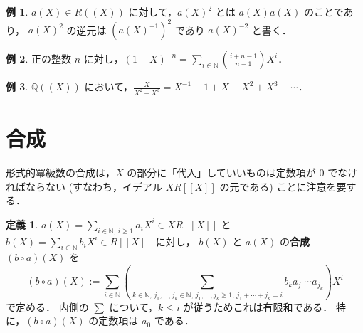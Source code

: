 \documentclass{jsarticle}
\newcommand{\N}{\mathbb{N}}
\newcommand{\Q}{\mathbb{Q}}
\theoremstyle{definition}
\newtheorem*{Dfn}{定義}
\newtheorem*{Exm}{例}
\newenvironment{dfn}{\vspace{1ex}\begin{screen}\begin{Dfn}}{\end{Dfn}\end{screen}\vspace{1ex}}
\newenvironment{exm}{\begin{leftbar}\begin{Exm}}{\end{Exm}\end{leftbar}}
\begin{document}
\begin{exm}
  $a(X) \in R((X))$ に対して，$a(X)^2$ とは $a(X) a(X)$ のことであり，
  $a(X)^2$ の逆元は $(a(X)^{-1})^2$ であり $a(X)^{-2}$ と書く．
\end{exm}

\begin{exm}
  正の整数 $n$ に対し，$(1 - X)^{-n} = \sum_{i\in\N} \binom{i+n-1}{n-1} X^i$．
\end{exm}

\begin{exm}
  $\Q((X))$ において，$\frac{X}{X^2 + X^3} = X^{-1} - 1 + X - X^2 + X^3 - \cdots$．
\end{exm}


\section{合成}
形式的冪級数の合成は，$X$ の部分に「代入」していいものは定数項が $0$ でなければならない (すなわち，イデアル $X R[[X]]$ の元である) ことに注意を要する．

\begin{dfn}
  $a(X) = \sum_{i\in\N,\,i\ge 1} a_i X^i \in X R[[X]]$ と
  $b(X) = \sum_{i\in\N} b_i X^i \in R[[X]]$ に対し，
  $b(X)$ と $a(X)$ の\textbf{合成} $(b \circ a)(X)$ を
  \[
    (b \circ a)(X) := \sum_{i\in\N} \left(\sum_{k\in\N,\, j_1,\ldots,j_k\in\N,\, j_1,\ldots,j_k\ge 1,\, j_1+\cdots+j_k=i} b_k a_{j_1} \cdots a_{j_k} \right) X^i
  \]
  で定める．
  内側の $\sum$ について，$k \le i$ が従うためこれは有限和である．
  特に，$(b \circ a)(X)$ の定数項は $a_0$ である．
\end{dfn}
\end{document}
